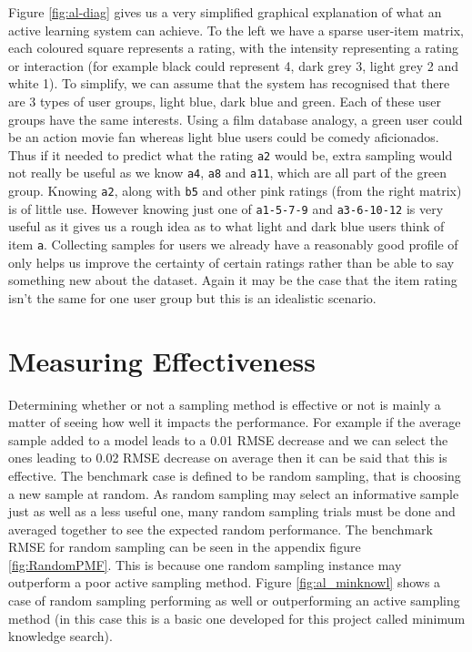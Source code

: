 Figure \ref{fig:al-diag} gives us a very simplified graphical explanation of what an active learning system can achieve. To the left we have a sparse user-item matrix, each coloured square represents a rating, with the intensity representing a rating or interaction (for example black could represent 4, dark grey 3, light grey 2 and white 1). To simplify, we can assume that the system has recognised that there are 3 types of user groups, light blue, dark blue and green. Each of these user groups have the same interests. Using a film database analogy, a green user could be an action movie fan whereas light blue users could be comedy aficionados. Thus if it needed to predict what the rating \texttt{a2} would be, extra sampling would not really be useful as we know \texttt{a4}, \texttt{a8} and \texttt{a11}, which are all part of the green group. Knowing \texttt{a2}, along with \texttt{b5} and other pink ratings (from the right matrix) is of little use. However knowing just one of \texttt{a1-5-7-9} and \texttt{a3-6-10-12} is very useful as it gives us a rough idea as to what light and dark blue users think of item \texttt{a}. Collecting samples for users we already have a reasonably good profile of only helps us improve the certainty of certain ratings rather than be able to say something new about the dataset. Again it may be the case that the item rating isn't the same for one user group but this is an idealistic scenario.


\section{Measuring Effectiveness}
Determining whether or not a sampling method is effective or not is mainly a matter of seeing how well it impacts the performance. For example if the average sample added to a model leads to a 0.01 RMSE decrease and we can select the ones leading to 0.02 RMSE decrease on average then it can be said that this is effective. The benchmark case is defined to be random sampling, that is choosing a new sample at random. As random sampling may select an informative sample just as well as a less useful one, many random sampling trials must be done and averaged together to see the expected random performance. The benchmark RMSE for random sampling can be seen in the appendix figure \ref{fig:RandomPMF}. This is because one random sampling instance may outperform a poor active sampling method. Figure \ref{fig:al_minknowl} shows a case of random sampling performing as well or outperforming an active sampling method (in this case this is a basic one developed for this project called minimum knowledge search).

